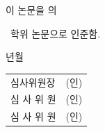 \begin{titlepage}
\thispagestyle{empty}
\begin{center}

\vspace*{28mm}

{\fontsize{18pt}{28pt}\selectfont
  이 논문을 \AuthorKRPlain 의\par
  \vspace{4mm}
  \FieldKR\ \DegreeKR 학위 논문으로 인준함.\par}

\vspace{30mm}

{\fontsize{14pt}{18pt}\selectfont
  \SubmissionYear 년\quad \SubmissionMonth 월\par}

\vspace{40mm}

{\fontsize{14pt}{22pt}\selectfont
\begin{tabular}{ll}
심사위원장 & \hspace{45mm}(인)\\[10mm]
심 사 위 원 & \hspace{45mm}(인)\\[10mm]
심 사 위 원 & \hspace{45mm}(인)\\[10mm]
\end{tabular}
}

\vspace*{10mm}

\end{center}
\end{titlepage}
